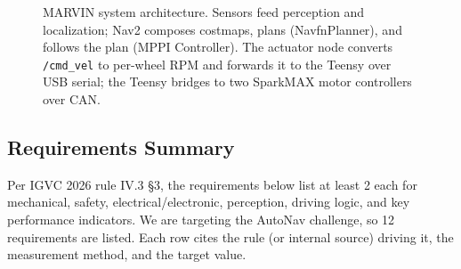 \documentclass[12pt, letterpaper]{article}
\newcommand{\robotname}{MARVIN}
\begin{document}
\begin{figure}[H]
    \caption{\robotname{} system architecture. Sensors feed perception and localization;
    Nav2 composes costmaps, plans (NavfnPlanner), and follows the plan (MPPI Controller).
    The actuator node converts \texttt{/cmd\_vel} to per-wheel RPM and forwards it to the
    Teensy over USB serial; the Teensy bridges to two SparkMAX motor controllers over CAN.}
    \label{fig:system_arch}
\end{figure}

\subsection{Requirements Summary}

Per IGVC 2026 rule IV.3 \S3, the requirements below list at least 2 each for
mechanical, safety, electrical/electronic, perception, driving logic, and key
performance indicators. We are targeting the AutoNav challenge, so 12 requirements are
listed. Each row cites the rule (or internal source) driving it, the measurement
method, and the target value.
\end{document}
